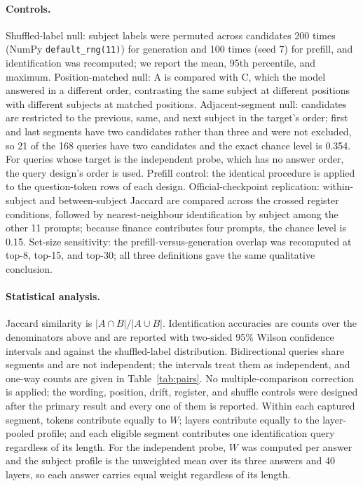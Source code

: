 \paragraph{Controls.} Shuffled-label null: subject labels were permuted across candidates 200 times (NumPy \texttt{default\_rng(11)}) for generation and 100 times (seed 7) for prefill, and identification was recomputed; we report the mean, 95th percentile, and maximum. Position-matched null: A is compared with C, which the model answered in a different order, contrasting the same subject at different positions with different subjects at matched positions. Adjacent-segment null: candidates are restricted to the previous, same, and next subject in the target's order; first and last segments have two candidates rather than three and were not excluded, so 21 of the 168 queries have two candidates and the exact chance level is 0.354. For queries whose target is the independent probe, which has no answer order, the query design's order is used. Prefill control: the identical procedure is applied to the question-token rows of each design. Official-checkpoint replication: within-subject and between-subject Jaccard are compared across the crossed register conditions, followed by nearest-neighbour identification by subject among the other 11 prompts; because finance contributes four prompts, the chance level is 0.15. Set-size sensitivity: the prefill-versus-generation overlap was recomputed at top-8, top-15, and top-30; all three definitions gave the same qualitative conclusion.

\paragraph{Statistical analysis.} Jaccard similarity is $|A\cap B|/|A\cup B|$. Identification accuracies are counts over the denominators above and are reported with two-sided 95\% Wilson confidence intervals and against the shuffled-label distribution. Bidirectional queries share segments and are not independent; the intervals treat them as independent, and one-way counts are given in Table~\ref{tab:pairs}. No multiple-comparison correction is applied; the wording, position, drift, register, and shuffle controls were designed after the primary result and every one of them is reported. Within each captured segment, tokens contribute equally to $W$; layers contribute equally to the layer-pooled profile; and each eligible segment contributes one identification query regardless of its length. For the independent probe, $W$ was computed per answer and the subject profile is the unweighted mean over its three answers and 40 layers, so each answer carries equal weight regardless of its length.

